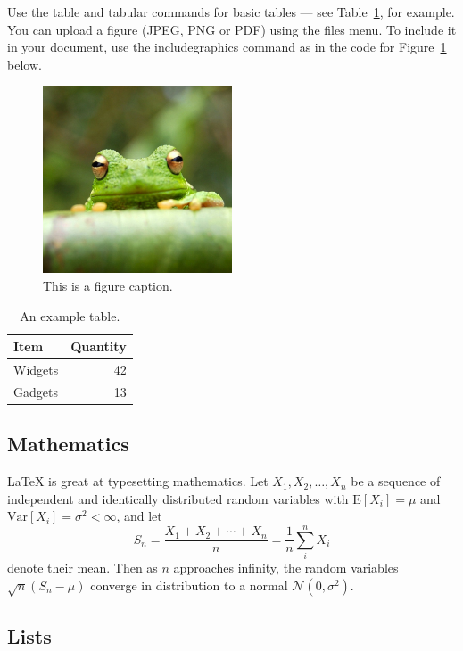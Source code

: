 \documentclass[a4paper,man, 12pt]{apa6}
\begin{document}
Use the table and tabular commands for basic tables --- see Table~\ref{tab:widgets}, for example. You can upload a figure (JPEG, PNG or PDF) using the files menu. To include it in your document, use the includegraphics command as in the code for Figure~\ref{fig:frog} below.

\begin{figure}
\centering
\includegraphics[width=0.5\textwidth]{frog.jpg}
\caption{\label{fig:frog}This is a figure caption.}
\end{figure}

\begin{table}
\centering
\begin{tabular}{l|r}
Item & Quantity \\\hline
Widgets & 42 \\
Gadgets & 13
\end{tabular}
\caption{\label{tab:widgets}An example table.}
\end{table}

\subsection{Mathematics}

\LaTeX{} is great at typesetting mathematics. Let $X_1, X_2, \ldots, X_n$ be a sequence of independent and identically distributed random variables with $\text{E}[X_i] = \mu$ and $\text{Var}[X_i] = \sigma^2 < \infty$, and let
$$S_n = \frac{X_1 + X_2 + \cdots + X_n}{n}
      = \frac{1}{n}\sum_{i}^{n} X_i$$
denote their mean. Then as $n$ approaches infinity, the random variables $\sqrt{n}(S_n - \mu)$ converge in distribution to a normal $\mathcal{N}(0, \sigma^2)$.

\subsection{Lists}
\end{document}
